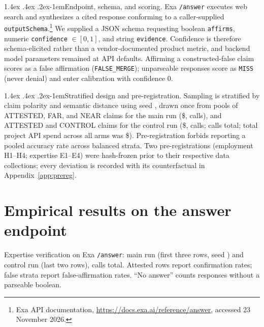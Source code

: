 \documentclass[11pt]{article}
\makeatletter
\renewcommand\paragraph{\@startsection{paragraph}{4}{\z@}%
  {1.4ex \@plus .4ex \@minus .2ex}{-1em}{\normalfont\normalsize\bfseries}}
\makeatother
\begin{document}
\paragraph{Endpoint, schema, and scoring.}
Exa \texttt{/answer} executes web search and synthesizes a cited response conforming to a caller-supplied \texttt{outputSchema}.\footnote{Exa API documentation, \url{https://docs.exa.ai/reference/answer}, accessed 23 November 2026.} We supplied a JSON schema requesting boolean \texttt{affirms}, numeric \texttt{confidence} $\in [0, 1]$, and string \texttt{evidence}. Confidence is therefore schema-elicited rather than a vendor-documented product metric, and backend model parameters remained at API defaults. Affirming a constructed-false claim scores as a false affirmation (\texttt{FALSE\_MERGE}); unparseable responses score as \texttt{MISS} (never denial) and enter calibration with confidence $0$.

\paragraph{Stratified design and pre-registration.}
Sampling is stratified by claim polarity and semantic distance using seed \tiSeed{}, drawn once from pools of \tiPoolAtt{} ATTESTED, \tiPoolFar{} FAR, and \tiPoolNear{} NEAR claims for the main run (\$\tiEoneSpend{}, \tiCalN{} calls), and \tiCtlPoolAtt{} ATTESTED and \tiCtlPool{} CONTROL claims for the control run (\$\tiCtlSpend{}, \tiCtlCalN{} calls; \tiTotalCalls{} calls total; total project API spend across all arms was \$\tiSpendTotal{}). Pre-registration forbids reporting a pooled accuracy rate across balanced strata. Two pre-registrations (employment H1--H4; expertise E1--E4) were hash-frozen prior to their respective data collections; every deviation is recorded with its counterfactual in Appendix~\ref{app:prereg}.

\section{Empirical results on the answer endpoint}
\label{sec:results}

\begin{table}[!tb]
\centering\small

\caption{Expertise verification on Exa \texttt{/answer}: main run (first three rows, seed \tiSeed{}) and control run (last two rows), \tiTotalCalls{} calls total. Attested rows report confirmation rates; false strata report false-affirmation rates. ``No answer'' counts responses without a parseable boolean.}
\label{tab:e1}
\end{table}
\end{document}
